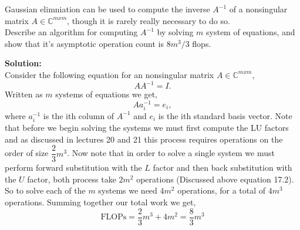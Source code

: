 \documentclass[12pt]{article}
\makeatletter
\theoremstyle{homework}
\newenvironment{exercise}[1]
{\def\@currentlabel{#1}\exercisecore}
{\endexercisecore}
\newcommand{\localhead}[1]{\par\smallskip\noindent\textbf{#1}\nobreak\\}%
\newcommand\solution{\localhead{Solution:}}
\newcommand{\Cplx}{\ensuremath{\mathbb C}}
\let\CC\Cplx
\makeatother
\begin{document}
\begin{exercise}{21.1}
  \vspace{1in}


  \begin{exercise}{21.4(a)} Gaussian elimniation can be used to compute the inverse $A^{-1}$ of a nonsingular matrix $A \in \CC^{mxm}$, though 
    it is rarely really necessary to do so.\\
    Describe an algorithm for computing $A^{-1}$ by solving $m$ system of equations, and show that it's asymptotic operation count is $8m^3/3$ flops.\\
    \solution Consider the following equation for an nonsingular matrix $A \in \CC^{mxm}$, 
    \begin{equation*}
      AA^{-1} = I.
    \end{equation*}
    Written as $m$ systems of equations we get, 
    \begin{equation*}
      Aa^{-1}_i = e_i,
    \end{equation*}
    where $a^{-1}_i$ is the ith column of $A^{-1}$ and $e_i$ is the ith standard basis vector.
    Note that before we begin solving the systems we must first compute the LU factors and as discussed in lectures 20 and 21 this process 
    requires operations on the order of size $\dfrac{2}{3}m^3$. Now note that in order to solve a single system we must perform forward substitution with 
    the $L$ factor and then back substitution with the $U$ factor, both process take $2m^2$ operations (Discussed above equation 17.2). So to solve each of the $m$ systems we need 
    $4m^2$ operations, for a total of $4m^3$ operations. Summing together our total work we get, 
    \begin{equation*}
      \text{FLOPs} = \dfrac{2}{3}m^3 + 4m^2 = \dfrac{8}{3}m^3
    \end{equation*}

    
  \end{exercise}
  
\end{exercise}
\end{document}
